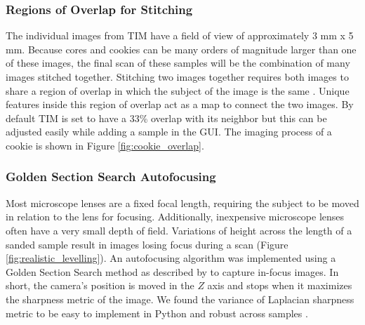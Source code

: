 \documentclass[a4paper,12pt]{article}
\newcommand{\R}[1]{\label{#1}\linelabel{#1}}
\begin{document}



\subsubsection{Regions of Overlap for Stitching}

The individual images from TIM have a field of view of approximately 3 mm x 5 mm. Because cores and cookies can be many orders of magnitude larger than one of these images, the final scan of these samples will be the combination of many images stitched together.
Stitching two images together requires both images to share a region of overlap in which the subject of the image is the same \citep{mohammadi_comparative_2024}.
Unique features inside this region of overlap act as a map to connect the two images.
By default TIM is set to have a 33\% overlap with its neighbor but this can be adjusted easily while adding a sample in the GUI. The imaging process of a cookie is shown in Figure \ref{fig:cookie_overlap}.


\subsubsection{Golden Section Search Autofocusing}

Most microscope lenses are a fixed focal length, requiring the subject to be moved in relation to the lens for focusing. Additionally, inexpensive microscope lenses often have a very small depth of field. 
Variations of height across the length of a sanded sample result in images losing focus during a scan (Figure \ref{fig:realistic_levelling}). 
An autofocusing algorithm was implemented using a Golden Section Search method as described by \citet{gu_region_2015} to capture in-focus images.\R{line_change_3} In short, the camera's position is moved in the $Z$ axis and stops when it maximizes the sharpness metric of the image. 
We found the variance of Laplacian sharpness metric to be easy to implement in Python and robust across samples \citep{pech-pacheco_diatom_2000}. 
\end{document}
